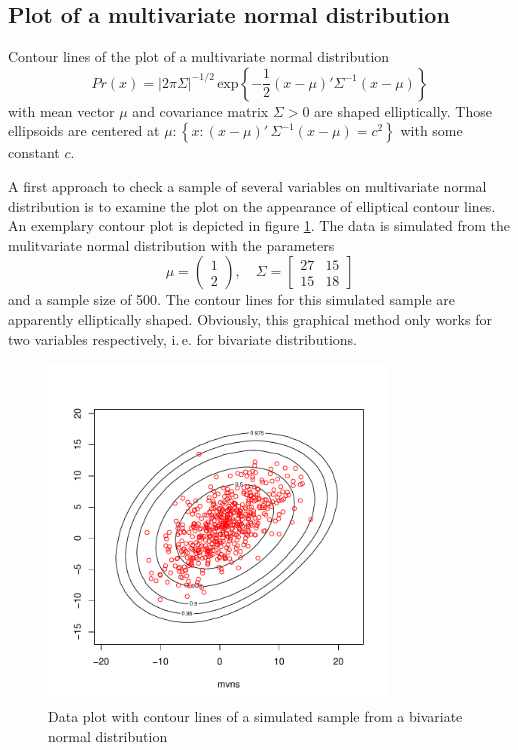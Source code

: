 \documentclass[a4paper, 12pt, titlepage, headsepline, listof = totoc, bibliography = totoc, numbers = noenddot]{scrartcl}
\newcommand{\ie}{i.\,e. }
\begin{document}
\vfill




\newpage
\subsection{Plot of a multivariate normal distribution}

Contour lines of the plot of a multivariate normal distribution
\[Pr(x) = |2\pi\Sigma|^{-1/2} \,\mbox{exp}\left\{-\frac{1}{2}(x-\mu)' \Sigma^{-1}(x-\mu)\right\}\]
with mean vector $\mu$ and covariance matrix $\Sigma > 0$ are shaped elliptically. Those ellipsoids are centered at $\mu : \left\{x:(x-\mu)'\, \Sigma^{-1}(x-\mu) = c^2\right\}$ with some constant $c$.

A first approach to check a sample of several variables on multivariate normal distribution is to examine the plot on the appearance of elliptical contour lines. An exemplary contour plot is depicted in figure \ref{fig:plotMVNSim}. The data is simulated from the mulitvariate normal distribution with the parameters
\[\mu = \left(\begin{array}{c} 1\\ 2\end{array} \right), \quad \Sigma = \left[\begin{array}{cc} 27 & 15\\ 15 & 18\end{array} \right]\]
and a sample size of 500. The contour lines for this simulated sample are apparently elliptically shaped. Obviously, this graphical method only works for two variables respectively, \ie for bivariate distributions.

\begin{figure}[h!]
\centering
\includegraphics[width=0.8\textwidth]{report-plotMVNSim}
\caption{Data plot with contour lines of a simulated sample from a bivariate normal distribution}
\label{fig:plotMVNSim}
\end{figure}
\end{document}
